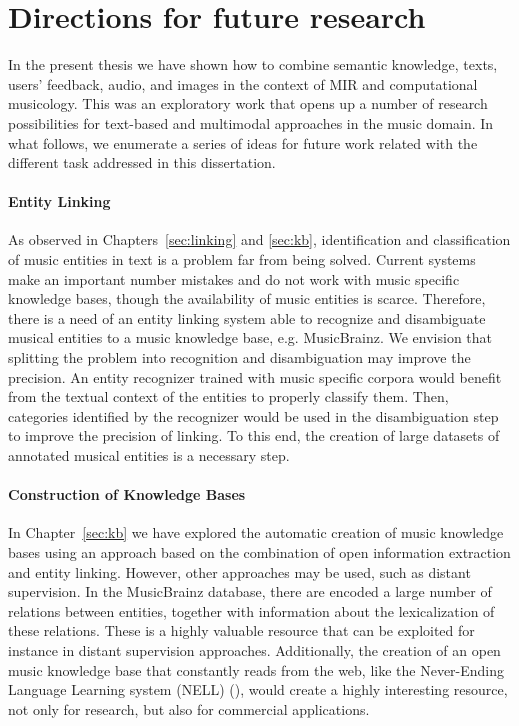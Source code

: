 \section{Directions for future research}
\label{sec:conclusion:future}

In the present thesis we have shown how to combine semantic knowledge, texts, users' feedback, audio, and images in the context of MIR and computational musicology. This was an exploratory work that opens up a number of research possibilities for text-based and multimodal approaches in the music domain. In what follows, we enumerate a series of ideas for future work related with the different task addressed in this dissertation.

\paragraph{Entity Linking} As observed in Chapters~\ref{sec:linking} and \ref{sec:kb}, identification and classification of music entities in text is a problem far from being solved. Current systems make an important number mistakes and do not work with music specific knowledge bases, though the availability of music entities is scarce. Therefore, there is a need of an entity linking system able to recognize and disambiguate musical entities to a music knowledge base, e.g. MusicBrainz. We envision that splitting the problem into recognition and disambiguation may improve the precision. An entity recognizer trained with music specific corpora would benefit from the textual context of the entities to properly classify them. Then, categories identified by the recognizer would be used in the disambiguation step to improve the precision of linking. To this end, the creation of large datasets of annotated musical entities is a necessary step. %

\paragraph{Construction of Knowledge Bases} In Chapter~\ref{sec:kb} we have explored the automatic creation of music knowledge bases using an approach based on the combination of open information extraction and entity linking. However, other approaches may be used, such as distant supervision. In the MusicBrainz database, there are encoded a large number of relations between entities, together with information about the lexicalization of these relations. These is a highly valuable resource that can be exploited for instance in distant supervision approaches. Additionally, the creation of an open music knowledge base that constantly reads from the web, like the Never-Ending Language Learning system (NELL) (\cite{Carlson2010a}), would create a highly interesting resource, not only for research, but also for commercial applications.

